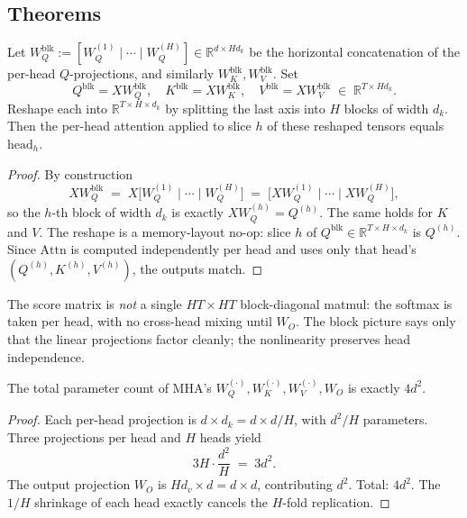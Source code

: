 \subsection*{Theorems}

\begin{theorem}[MHA = block-structured single attention]
\label{thm:block}
Let $W_Q^{\mathrm{blk}} := [W_Q^{(1)} \mid \cdots \mid W_Q^{(H)}] \in \mathbb{R}^{d \times H d_k}$ be the horizontal concatenation of the per-head $Q$-projections, and similarly $W_K^{\mathrm{blk}}, W_V^{\mathrm{blk}}$. Set
\[
Q^{\mathrm{blk}} = X W_Q^{\mathrm{blk}}, \quad K^{\mathrm{blk}} = X W_K^{\mathrm{blk}}, \quad V^{\mathrm{blk}} = X W_V^{\mathrm{blk}} \;\in\; \mathbb{R}^{T \times H d_k}.
\]
Reshape each into $\mathbb{R}^{T \times H \times d_k}$ by splitting the last axis into $H$ blocks of width $d_k$. Then the per-head attention applied to slice $h$ of these reshaped tensors equals $\mathrm{head}_h$.
\end{theorem}
\begin{proof}
By construction
\[
X W_Q^{\mathrm{blk}} \;=\; X \bigl[W_Q^{(1)} \mid \cdots \mid W_Q^{(H)}\bigr] \;=\; \bigl[X W_Q^{(1)} \mid \cdots \mid X W_Q^{(H)}\bigr],
\]
so the $h$-th block of width $d_k$ is exactly $X W_Q^{(h)} = Q^{(h)}$. The same holds for $K$ and $V$. The reshape is a memory-layout no-op: slice $h$ of $Q^{\mathrm{blk}} \in \mathbb{R}^{T \times H \times d_k}$ is $Q^{(h)}$. Since $\mathrm{Attn}$ is computed independently per head and uses only that head's $(Q^{(h)}, K^{(h)}, V^{(h)})$, the outputs match.
\end{proof}

\begin{remark}
The score matrix is \emph{not} a single $HT \times HT$ block-diagonal matmul: the softmax is taken per head, with no cross-head mixing until $W_O$. The block picture says only that the linear projections factor cleanly; the nonlinearity preserves head independence.
\end{remark}

\begin{theorem}
\label{thm:params}
The total parameter count of MHA's $W_Q^{(\cdot)}, W_K^{(\cdot)}, W_V^{(\cdot)}, W_O$ is exactly $4 d^2$.
\end{theorem}
\begin{proof}
Each per-head projection is $d \times d_k = d \times d/H$, with $d^2/H$ parameters. Three projections per head and $H$ heads yield
\[
3 H \cdot \frac{d^2}{H} \;=\; 3 d^2.
\]
The output projection $W_O$ is $H d_v \times d = d \times d$, contributing $d^2$. Total: $4 d^2$. The $1/H$ shrinkage of each head exactly cancels the $H$-fold replication.
\end{proof}

